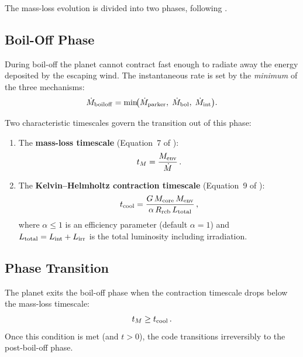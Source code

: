 \documentclass{aastex701}
\newcommand{\Mdot}{\dot{M}}
\newcommand{\Menv}{M_{\rm env}}
\newcommand{\Mcore}{M_{\rm core}}
\newcommand{\Rrcb}{R_{\rm rcb}}
\newcommand{\Lint}{L_{\rm int}}
\begin{document}
The mass-loss evolution is divided into two phases, following
\citet{Tang2024}.

\subsection{Boil-Off Phase}\label{subsec:boiloff}

During boil-off the planet cannot contract fast enough to radiate
away the energy deposited by the escaping wind.  The instantaneous
rate is set by the \emph{minimum} of the three mechanisms:
\begin{equation}\label{eq:mdot_boiloff}
  \Mdot_{\rm boiloff}
  = \min\!\bigl(\Mdot_{\rm parker},\;
                \Mdot_{\rm bol},\;
                \Mdot_{\rm int}\bigr).
\end{equation}

Two characteristic timescales govern the transition out of this phase:
\begin{enumerate}
  \item The \textbf{mass-loss timescale}
        (Equation~7 of \citealt{Tang2024}):
        \begin{equation}\label{eq:tM}
          t_{M} = \frac{\Menv}{\Mdot}\,.
        \end{equation}
  \item The \textbf{Kelvin--Helmholtz contraction timescale}
        (Equation~9 of \citealt{Tang2024}):
        \begin{equation}\label{eq:tcool}
          t_{\rm cool}
          = \frac{G\,\Mcore\,\Menv}{\alpha\,\Rrcb\,L_{\rm total}}\,,
        \end{equation}
        where $\alpha \le 1$ is an efficiency parameter (default
        $\alpha = 1$) and $L_{\rm total} = \Lint + L_{\rm irr}$ is the
        total luminosity including irradiation.
\end{enumerate}

\subsection{Phase Transition}\label{subsec:transition}

The planet exits the boil-off phase when the contraction timescale
drops below the mass-loss timescale:
\begin{equation}\label{eq:transition}
  t_{M} \ge t_{\rm cool}\,.
\end{equation}
Once this condition is met (and $t > 0$), the code transitions
irreversibly to the post-boil-off phase.
\end{document}
